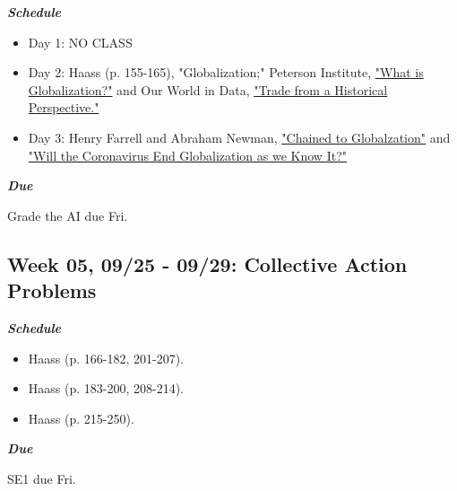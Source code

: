 \documentclass[11pt,]{article}
\begin{document}
\begin{multicols}{2}

\textbf{\textit{Schedule}}

\begin{itemize}

\item Day 1: NO CLASS

\item Day 2: Haass (p. 155-165), "Globalization;" Peterson Institute, \href{https://www.piie.com/microsites/globalization/what-is-globalization}{"What is Globalization?"} and Our World in Data, \href{https://ourworldindata.org/trade-and-globalization#trade-from-a-historical-perspective}{"Trade from a Historical Perspective."}

\item Day 3: Henry Farrell and Abraham Newman, \href{https://www.foreignaffairs.com/articles/united-states/2019-12-10/chained-globalization}{"Chained to Globalzation"} and \href{https://www.foreignaffairs.com/articles/2020-03-16/will-coronavirus-end-globalization-we-know-it}{"Will the Coronavirus End Globalization as we Know It?"}

\end{itemize}

\columnbreak

\begin{flushright}

\textbf{\textit{Due}}

Grade the AI due Fri.

\end{flushright}

\end{multicols}

\hypertarget{week-05-0925---0929-collective-action-problems}{%
\subsection{Week 05, 09/25 - 09/29: Collective Action
Problems}\label{week-05-0925---0929-collective-action-problems}}

\begin{multicols}{2}

\textbf{\textit{Schedule}}

\begin{itemize}

\item Haass (p. 166-182, 201-207).

\item Haass (p. 183-200, 208-214).

\item Haass (p. 215-250).

\end{itemize}

\columnbreak

\begin{flushright}

\textbf{\textit{Due}}

SE1 due Fri.

\end{flushright}

\end{multicols}
\end{document}
